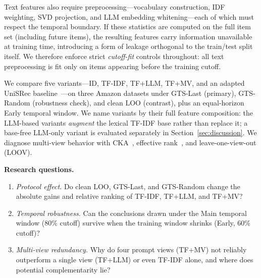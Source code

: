 \documentclass[sigconf,natbib=true,anonymous]{acmart}
\newcommand{\tfidf}{\textsc{TF-IDF}\xspace}
\newcommand{\llm}{\textsc{LLM}\xspace}
\newcommand{\tfllm}{\textsc{TF+LLM}\xspace}
\newcommand{\tfmv}{\textsc{TF+MV}\xspace}
\begin{document}
Text features also require preprocessing---vocabulary construction, IDF weighting, SVD projection, and LLM embedding whitening---each of which must respect the temporal boundary.
If these statistics are computed on the full item set (including future items), the resulting features carry information unavailable at training time, introducing a form of leakage orthogonal to the train/test split itself.
We therefore enforce strict \emph{cutoff-fit} controls throughout: all text preprocessing is fit only on items appearing before the training cutoff.

We compare five variants---ID, \tfidf, \tfllm, \tfmv, and an adapted UniSRec baseline~\cite{hou2022unisrec}---on three Amazon datasets under GTS-Last (primary), GTS-Random (robustness check), and clean LOO (contrast), plus an equal-horizon Early temporal window.
We name variants by their full feature composition: the \llm-based variants \emph{augment} the lexical \tfidf base rather than replace it; a base-free LLM-only variant is evaluated separately in Section~\ref{sec:discussion}.
We diagnose multi-view behavior with CKA~\cite{kornblith2019cka}, effective rank~\cite{roy2007effective}, and leave-one-view-out (LOOV).

\smallskip\noindent\textbf{Research questions.}
\begin{enumerate}[leftmargin=*,itemsep=1pt]
\item[\textbf{RQ1}] \emph{Protocol effect.}
Do clean LOO, GTS-Last, and GTS-Random change the absolute gains and relative ranking of \tfidf, \tfllm, and \tfmv?
\item[\textbf{RQ2}] \emph{Temporal robustness.}
Can the conclusions drawn under the Main temporal window ($80\%$ cutoff) survive when the training window shrinks (Early, $60\%$ cutoff)?
\item[\textbf{RQ3}] \emph{Multi-view redundancy.}
Why do four prompt views (\tfmv) not reliably outperform a single view (\tfllm) or even \tfidf alone, and where does potential complementarity lie?
\end{enumerate}
\end{document}
